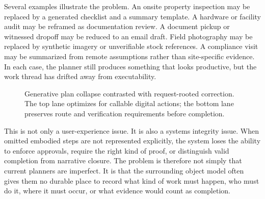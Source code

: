 Several examples illustrate the problem. An onsite property inspection may be replaced by a generated checklist and a summary template. A hardware or facility audit may be reframed as documentation review. A document pickup or witnessed dropoff may be reduced to an email draft. Field photography may be replaced by synthetic imagery or unverifiable stock references. A compliance visit may be summarized from remote assumptions rather than site-specific evidence. In each case, the planner still produces something that looks productive, but the work thread has drifted away from executability.

\begin{figure}[t]
\centering
{}
\caption{Generative plan collapse contrasted with request-rooted correction. The top lane optimizes for callable digital actions; the bottom lane preserves route and verification requirements before completion.}
\label{fig:collapse}
\end{figure}

This is not only a user-experience issue. It is also a systems integrity issue. When omitted embodied steps are not represented explicitly, the system loses the ability to enforce approvals, require the right kind of proof, or distinguish valid completion from narrative closure. The problem is therefore not simply that current planners are imperfect. It is that the surrounding object model often gives them no durable place to record what kind of work must happen, who must do it, where it must occur, or what evidence would count as completion.

